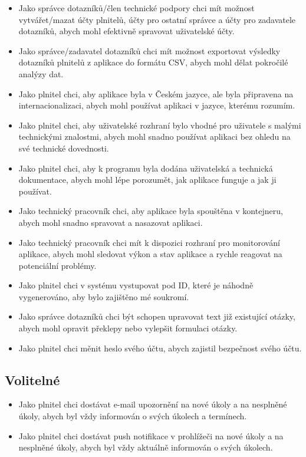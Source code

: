 \begin{itemize}
  \item
  Jako správce dotazníků/člen technické podpory chci mít možnost vytvářet/mazat účty plnitelů, účty pro ostatní správce a účty pro zadavatele dotazníků, abych mohl efektivně spravovat uživatelské účty.
  \item
  Jako správce/zadavatel dotazníků chci mít možnost exportovat výsledky dotazníků plnitelů z aplikace do formátu CSV, abych mohl dělat pokročilé analýzy dat.
  \item
  Jako plnitel chci, aby aplikace byla v Českém jazyce, ale byla připravena na internacionalizaci, abych mohl používat aplikaci v jazyce, kterému rozumím.
  \item
  Jako plnitel chci, aby uživatelské rozhraní bylo vhodné pro uživatele s malými technickými znalostmi, abych mohl snadno používat aplikaci bez ohledu na své technické dovednosti.
  \item
  Jako plnitel chci, aby k programu byla dodána uživatelská a technická dokumentace, abych mohl lépe porozumět, jak aplikace funguje a jak ji používat.
  \item
  Jako technický pracovník chci, aby aplikace byla spouštěna v kontejneru, abych mohl snadno spravovat a nasazovat aplikaci.
  \item
  Jako technický pracovník chci mít k dispozici rozhraní pro monitorování aplikace, abych mohl sledovat výkon a stav aplikace a rychle reagovat na potenciální problémy.
  \item
  Jako plnitel chci v systému vystupovat pod ID, které je náhodně vygenerováno, aby bylo zajištěno mé soukromí.
  \item
  Jako správce dotazníků chci být schopen upravovat text již existující otázky, abych mohl opravit překlepy nebo vylepšit formulaci otázky.
  \item
  Jako plnitel chci měnit heslo svého účtu, abych zajistil bezpečnost svého účtu.
\end{itemize}

\subsection{Volitelné}\label{subsec:volitelne}

\begin{itemize}
  \item
  Jako plnitel chci dostávat e-mail upozornění na nové úkoly a na nesplněné úkoly, abych byl vždy informován o svých úkolech a termínech.
  \item
  Jako plnitel chci dostávat push notifikace v prohlížeči na nové úkoly a na nesplněné úkoly, abych byl vždy aktuálně informován o svých úkolech.
\end{itemize}

